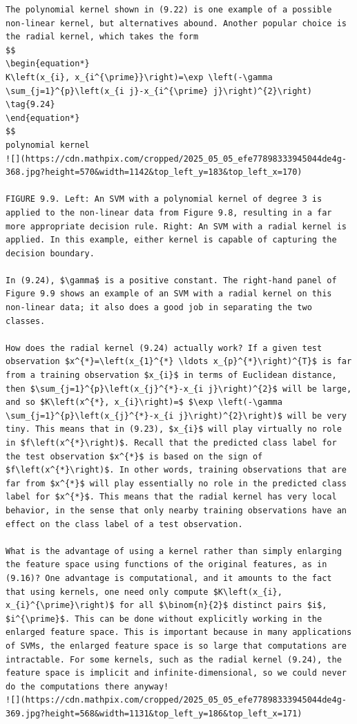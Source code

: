 \documentclass[10pt]{article}
\begin{document}
\begin{verbatim}
The polynomial kernel shown in (9.22) is one example of a possible non-linear kernel, but alternatives abound. Another popular choice is the radial kernel, which takes the form
$$
\begin{equation*}
K\left(x_{i}, x_{i^{\prime}}\right)=\exp \left(-\gamma \sum_{j=1}^{p}\left(x_{i j}-x_{i^{\prime} j}\right)^{2}\right) \tag{9.24}
\end{equation*}
$$
polynomial kernel
![](https://cdn.mathpix.com/cropped/2025_05_05_efe77898333945044de4g-368.jpg?height=570&width=1142&top_left_y=183&top_left_x=170)

FIGURE 9.9. Left: An SVM with a polynomial kernel of degree 3 is applied to the non-linear data from Figure 9.8, resulting in a far more appropriate decision rule. Right: An SVM with a radial kernel is applied. In this example, either kernel is capable of capturing the decision boundary.

In (9.24), $\gamma$ is a positive constant. The right-hand panel of Figure 9.9 shows an example of an SVM with a radial kernel on this non-linear data; it also does a good job in separating the two classes.

How does the radial kernel (9.24) actually work? If a given test observation $x^{*}=\left(x_{1}^{*} \ldots x_{p}^{*}\right)^{T}$ is far from a training observation $x_{i}$ in terms of Euclidean distance, then $\sum_{j=1}^{p}\left(x_{j}^{*}-x_{i j}\right)^{2}$ will be large, and so $K\left(x^{*}, x_{i}\right)=$ $\exp \left(-\gamma \sum_{j=1}^{p}\left(x_{j}^{*}-x_{i j}\right)^{2}\right)$ will be very tiny. This means that in (9.23), $x_{i}$ will play virtually no role in $f\left(x^{*}\right)$. Recall that the predicted class label for the test observation $x^{*}$ is based on the sign of $f\left(x^{*}\right)$. In other words, training observations that are far from $x^{*}$ will play essentially no role in the predicted class label for $x^{*}$. This means that the radial kernel has very local behavior, in the sense that only nearby training observations have an effect on the class label of a test observation.

What is the advantage of using a kernel rather than simply enlarging the feature space using functions of the original features, as in (9.16)? One advantage is computational, and it amounts to the fact that using kernels, one need only compute $K\left(x_{i}, x_{i}^{\prime}\right)$ for all $\binom{n}{2}$ distinct pairs $i$, $i^{\prime}$. This can be done without explicitly working in the enlarged feature space. This is important because in many applications of SVMs, the enlarged feature space is so large that computations are intractable. For some kernels, such as the radial kernel (9.24), the feature space is implicit and infinite-dimensional, so we could never do the computations there anyway!
![](https://cdn.mathpix.com/cropped/2025_05_05_efe77898333945044de4g-369.jpg?height=568&width=1131&top_left_y=186&top_left_x=171)


\end{verbatim}
\end{document}
